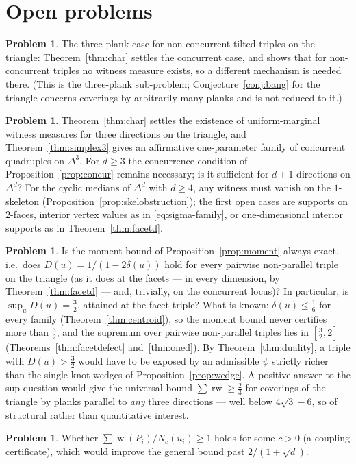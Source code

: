 \documentclass[11pt,reqno]{amsart}
\theoremstyle{plain}
\theoremstyle{definition}
\newtheorem{problem}[theorem]{Problem}
\theoremstyle{remark}
\newcommand{\rw}{\operatorname{rw}}
\DeclareMathOperator{\wid}{w}
\begin{document}
\section{Open problems}
\begin{problem}
The three-plank case for non-concurrent tilted triples on the triangle:
Theorem~\ref{thm:char} settles the concurrent case, and shows that for
non-concurrent triples no witness measure exists, so a different mechanism is
needed there. (This is the three-plank sub-problem; Conjecture~\ref{conj:bang}
for the triangle concerns coverings by arbitrarily many planks and is not
reduced to it.)
\end{problem}
\begin{problem}\label{prob:suff}
Theorem~\ref{thm:char} settles the existence of uniform-marginal witness
measures for three directions on the triangle, and Theorem~\ref{thm:simplex3}
gives an affirmative one-parameter family of concurrent quadruples on
$\Delta^3$. For $d\ge3$ the concurrence condition of
Proposition~\ref{prop:concur} remains necessary; is it sufficient for $d+1$
directions on $\Delta^d$? For the cyclic medians of $\Delta^d$ with $d\ge4$,
any witness must vanish on the $1$-skeleton
(Proposition~\ref{prop:skelobstruction}); the first open cases are supports on
$2$-faces, interior vertex values as in \eqref{eq:sigma-family}, or
one-dimensional interior supports as in Theorem~\ref{thm:facetd}.
\end{problem}
\begin{problem}\label{prob:defect}
Is the moment bound of Proposition~\ref{prop:moment} always exact, i.e.\ does
$D(u)=1/(1-2\delta(u))$ hold for every pairwise non-parallel triple on the
triangle (as it does at the facets --- in every dimension, by
Theorem~\ref{thm:facetd} --- and, trivially, on the concurrent locus)? In
particular, is $\sup_uD(u)=\tfrac32$, attained at the facet triple? What is
known: $\delta(u)\le\tfrac16$ for every family
(Theorem~\ref{thm:centroid}), so the moment bound never certifies more than
$\tfrac32$, and the supremum over pairwise non-parallel triples lies in
$[\tfrac32,2]$ (Theorems~\ref{thm:facetdefect} and~\ref{thm:oned}). By
Theorem~\ref{thm:duality}, a triple with $D(u)>\tfrac32$ would have to be
exposed by an admissible $\psi$ strictly richer than the single-knot wedges
of Proposition~\ref{prop:wedge}. A positive answer to the sup-question would
give the universal bound $\sum\rw\ge\tfrac23$ for coverings of the triangle
by planks parallel to \emph{any} three directions --- well below
$4\sqrt3-6$, so of structural rather than quantitative interest.
\end{problem}
\begin{problem}
Whether $\sum\wid(P_i)/N_c(u_i)\ge1$ holds for some $c>0$ (a coupling certificate),
which would improve the general bound past $2/(1+\sqrt d)$.
\end{problem}
\end{document}
